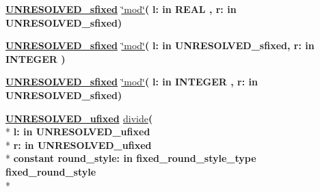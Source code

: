 \begin{DoxyCompactItemize}
\item 
{\bfseries {\bfseries {\bfseries \hyperlink{classfixed__pkg_aa723b28a027c3c0f9bca02d75e8df4d6}{U\+N\+R\+E\+S\+O\+L\+V\+E\+D\+\_\+sfixed}} \textcolor{vhdlchar}{ }}} \hyperlink{classfixed__pkg_a3ef5d5f2634d904601d29ae5c41d2f9e}{\char`\"{}mod\char`\"{}}{\bfseries  ( }{\bfseries \textcolor{vhdlchar}{l\+: }\textcolor{stringliteral}{in }{\bfseries \textcolor{comment}{R\+E\+A\+L}\textcolor{vhdlchar}{ }}}{\bfseries  , \textcolor{vhdlchar}{r\+: }\textcolor{stringliteral}{in }\textcolor{vhdlchar}{U\+N\+R\+E\+S\+O\+L\+V\+E\+D\+\_\+sfixed}}{\bfseries  )} 
\item 
{\bfseries {\bfseries {\bfseries \hyperlink{classfixed__pkg_aa723b28a027c3c0f9bca02d75e8df4d6}{U\+N\+R\+E\+S\+O\+L\+V\+E\+D\+\_\+sfixed}} \textcolor{vhdlchar}{ }}} \hyperlink{classfixed__pkg_a3ef5d5f2634d904601d29ae5c41d2f9e}{\char`\"{}mod\char`\"{}}{\bfseries  ( }{\bfseries \textcolor{vhdlchar}{l\+: }\textcolor{stringliteral}{in }\textcolor{vhdlchar}{U\+N\+R\+E\+S\+O\+L\+V\+E\+D\+\_\+sfixed}}{\bfseries  , \textcolor{vhdlchar}{r\+: }\textcolor{stringliteral}{in }{\bfseries \textcolor{comment}{I\+N\+T\+E\+G\+E\+R}\textcolor{vhdlchar}{ }}}{\bfseries  )} 
\item 
{\bfseries {\bfseries {\bfseries \hyperlink{classfixed__pkg_aa723b28a027c3c0f9bca02d75e8df4d6}{U\+N\+R\+E\+S\+O\+L\+V\+E\+D\+\_\+sfixed}} \textcolor{vhdlchar}{ }}} \hyperlink{classfixed__pkg_a3ef5d5f2634d904601d29ae5c41d2f9e}{\char`\"{}mod\char`\"{}}{\bfseries  ( }{\bfseries \textcolor{vhdlchar}{l\+: }\textcolor{stringliteral}{in }{\bfseries \textcolor{comment}{I\+N\+T\+E\+G\+E\+R}\textcolor{vhdlchar}{ }}}{\bfseries  , \textcolor{vhdlchar}{r\+: }\textcolor{stringliteral}{in }\textcolor{vhdlchar}{U\+N\+R\+E\+S\+O\+L\+V\+E\+D\+\_\+sfixed}}{\bfseries  )} 
\item 
{\bfseries {\bfseries {\bfseries \hyperlink{classfixed__pkg_ae78bc2b36d22f6abeac163955e8a587d}{U\+N\+R\+E\+S\+O\+L\+V\+E\+D\+\_\+ufixed}} \textcolor{vhdlchar}{ }}} \hyperlink{classfixed__pkg_ad3f8b999f2e7fa797352933c285309d8}{divide}{\bfseries  ( }\\*
{\bfseries \textcolor{vhdlchar}{l\+: }\textcolor{stringliteral}{in }\textcolor{vhdlchar}{U\+N\+R\+E\+S\+O\+L\+V\+E\+D\+\_\+ufixed}}\\*
{\bfseries \textcolor{vhdlchar}{r\+: }\textcolor{stringliteral}{in }\textcolor{vhdlchar}{U\+N\+R\+E\+S\+O\+L\+V\+E\+D\+\_\+ufixed}}\\*
{\bfseries {\bfseries \textcolor{keywordflow}{constant}\textcolor{vhdlchar}{ }}\textcolor{vhdlchar}{round\+\_\+style\+: }\textcolor{stringliteral}{in }\textcolor{vhdlchar}{fixed\+\_\+round\+\_\+style\+\_\+type     fixed\+\_\+round\+\_\+style}}\\*

\end{DoxyCompactItemize}
